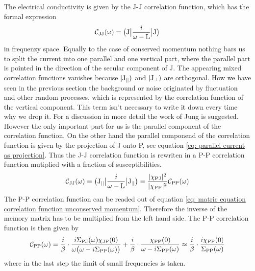 The electrical conductivity is given by the J-J correlation function, which has the formal expression
%
\begin{align}
	\mathcal{C}_{\mathrm{JJ}}(\omega) = \big({\mathrm{J}}\big| \frac{i}{\omega - \mathrm{L}} \big|{\mathrm{J}}\big)
\end{align}
%
in frequenzy space.
Equally to the case of conserved momentum nothing bars us to split the current into one parallel and one vertical part, where the parallel part is pointed in the direction of the secular component of J.
The appearing mixed correlation functions vanishes because $|\mathrm{\mathrm{J}_{\mid\mid}})$ and $|\mathrm{\mathrm{J}_{\bot}})$ are orthogonal.
How we have seen in the previous section the background or noise originated by fluctuation and other random processes, which is represented by the correlation function of the vertical component.
This term isn't necessary to write it down every time why we drop it.
For a discussion in more detail the work of Jung \cite{Jung} is suggested.
However the only important part for us is the parallel component of the correlation function.
On the other hand the parallel componend of the correlation function is given by the projection of J onto P, see equation \eqref{eq: parallel current as projection}.
Thus the J-J correlation function is rewriten in a P-P correlation function mutiplied with a fraction of susceptibilities.
%
\begin{align}
	\mathcal{C}_{\mathrm{JJ}}(\omega) = \big({\mathrm{J}_{\mid\mid}}\big| \frac{i}{\omega - \mathrm{L}} \big|{\mathrm{J}_{\mid\mid}}\big) = \frac{\vert\chi_{\mathrm{PJ}}\vert^{2}}{\vert\chi_{\mathrm{PP}}\vert^{2}} \mathcal{C}_{\mathrm{PP}}(\omega)
\end{align}
%
The P-P correlation function can be readed out of equation \eqref{eq: matric equation correlation function unconserved momentum}.
Therefore the inverse of the memory matrix has to be multiplied from the left hand side.
The P-P correlation function is then given by
%
\begin{align}
	\mathcal{C}_{\mathrm{PP}}(\omega) = \frac{i}{\beta} \cdot \frac{i \Sigma_{\mathrm{PJ}}(\omega)  \chi_{\mathrm{JP}}(0)}{\omega\big(\omega - i\Sigma_{\mathrm{PP}}(\omega)\big)} + \frac{i}{\beta} \cdot \frac{\chi_{\mathrm{PP}}(0)}{\omega - i\Sigma_{\mathrm{PP}}(\omega)} \approx \frac{i}{\beta} \cdot \frac{i \chi_{\mathrm{PP}}(0)}{\Sigma_{\mathrm{PP}}(\omega)}
\end{align}
%
where in the last step the limit of small frequencies is taken.
